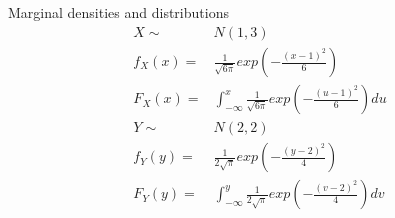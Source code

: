 \documentclass{article}
\begin{document}
\subsection{}
Marginal densities and distributions
\begin{align*}
    X \sim & N(1, 3)\\    
    f_X(x) =& \frac{1}{\sqrt{6\pi}}exp(-\frac{(x-1)^2}{6})\\ 
    F_X(x) =& \int^x_{-\infty} \frac{1}{\sqrt{6\pi}}exp(-\frac{(u-1)^2}{6})du\\
    Y \sim &N(2, 2)\\    
    f_Y(y) =& \frac{1}{2\sqrt{\pi}}exp(-\frac{(y-2)^2}{4})\\    
    F_Y(y) =& \int^y_{-\infty} \frac{1}{2\sqrt{\pi}}exp(-\frac{(v-2)^2}{4})dv
\end{align*}
\end{document}
